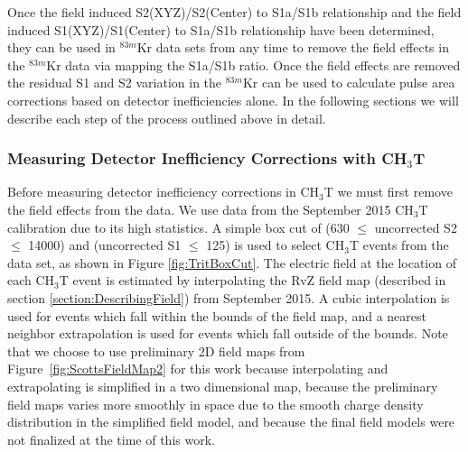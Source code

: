 Once the field induced S2(XYZ)/S2(Center) to S1a/S1b relationship and the field induced S1(XYZ)/S1(Center) to S1a/S1b relationship have been determined, they can be used in $^{83m}$Kr data sets from any time to remove the field effects in the $^{83m}$Kr data via mapping the S1a/S1b ratio.  Once the field effects are removed the residual S1 and S2 variation in the $^{83m}$Kr can be used to calculate pulse area corrections based on detector inefficiencies alone.  In the following sections we will describe each step of the process outlined above in detail.

\subsubsection{Measuring Detector Inefficiency Corrections with CH$_3$T}

Before measuring detector inefficiency corrections in CH$_3$T we must first remove the field effects from the data.  We use data from the September 2015 CH$_3$T calibration due to its high statistics.  A simple box cut of (630 $\leq$ uncorrected S2 $\leq$ 14000) and (uncorrected S1 $\leq$ 125) is used to select CH$_3$T events from the data set, as shown in Figure \ref{fig:TritBoxCut}. The electric field at the location of each CH$_3$T event is estimated by interpolating the RvZ field map (described in section \ref{section:DescribingField}) from September 2015.  A cubic interpolation is used for events which fall within the bounds of the field map, and a nearest neighbor extrapolation is used for events which fall outside of the bounds.   Note that we choose to use preliminary 2D field maps from Figure~\ref{fig:ScottsFieldMap2} for this work because interpolating and extrapolating is simplified in a two dimensional map, because the preliminary field maps varies more smoothly in space due to the smooth charge density distribution in the simplified field model, and because the final field models were not finalized at the time of this work.  

